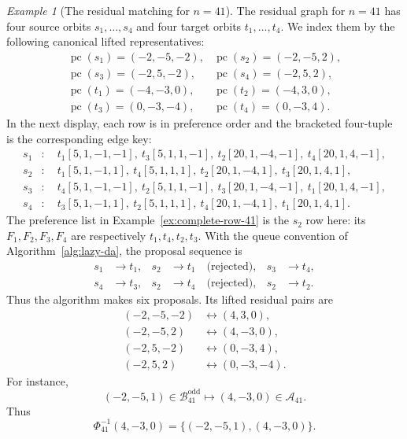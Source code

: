 \documentclass[11pt]{amsart}
\theoremstyle{definition}
\theoremstyle{remark}
\newtheorem{example}[theorem]{Example}
\newcommand{\pc}{\operatorname{pc}}
\begin{document}
\begin{example}[The residual matching for $n=41$]
\label{ex:41-residual}
The residual graph for $n=41$ has four source orbits $s_1,\ldots,s_4$ and
four target orbits $t_1,\ldots,t_4$.  We index them by the following
canonical lifted representatives:
\[
\begin{array}{ll}
 \pc(s_1)=(-2,-5,-2),&\pc(s_2)=(-2,-5,2),\\
 \pc(s_3)=(-2,5,-2), &\pc(s_4)=(-2,5,2),\\[2pt]
 \pc(t_1)=(-4,-3,0), &\pc(t_2)=(-4,3,0),\\
 \pc(t_3)=(0,-3,-4), &\pc(t_4)=(0,-3,4).
\end{array}
\]
In the next display, each row is in preference order and the bracketed
four-tuple is the corresponding edge key:
\[
\begin{aligned}
s_1&:\quad t_1[5,1,-1,-1],\ t_3[5,1,1,-1],
       \ t_2[20,1,-4,-1],\ t_4[20,1,4,-1],\\
s_2&:\quad t_1[5,1,-1,1],\ t_4[5,1,1,1],
       \ t_2[20,1,-4,1],\ t_3[20,1,4,1],\\
s_3&:\quad t_4[5,1,-1,-1],\ t_2[5,1,1,-1],
       \ t_3[20,1,-4,-1],\ t_1[20,1,4,-1],\\
s_4&:\quad t_3[5,1,-1,1],\ t_2[5,1,1,1],
       \ t_4[20,1,-4,1],\ t_1[20,1,4,1].
\end{aligned}
\]
The preference list in Example~\ref{ex:complete-row-41} is the
$s_2$ row here: its $F_1,F_2,F_3,F_4$ are respectively
$t_1,t_4,t_2,t_3$.
With the queue convention of Algorithm~\ref{alg:lazy-da}, the proposal
sequence is
\[
\begin{aligned}
s_1&\longrightarrow t_1,&
s_2&\longrightarrow t_1\quad\text{(rejected)},&
s_3&\longrightarrow t_4,\\
s_4&\longrightarrow t_3,&
s_2&\longrightarrow t_4\quad\text{(rejected)},&
s_2&\longrightarrow t_2.
\end{aligned}
\]
Thus the algorithm makes six proposals.  Its lifted residual pairs are
\[
\begin{aligned}
 (-2,-5,-2)&\longleftrightarrow(4,3,0),\\
 (-2,-5,2)&\longleftrightarrow(4,-3,0),\\
 (-2,5,-2)&\longleftrightarrow(0,-3,4),\\
 (-2,5,2)&\longleftrightarrow(0,-3,-4).
\end{aligned}
\]
For instance,
\[
 (-2,-5,1)\in\mathcal B_{41}^{\mathrm{odd}}
 \longmapsto
 (4,-3,0)\in\mathcal A_{41}.
\]
Thus
\[
\Phi_{41}^{-1}(4,-3,0)
 =\{(-2,-5,1),(4,-3,0)\}.
\]
\end{example}
\end{document}
